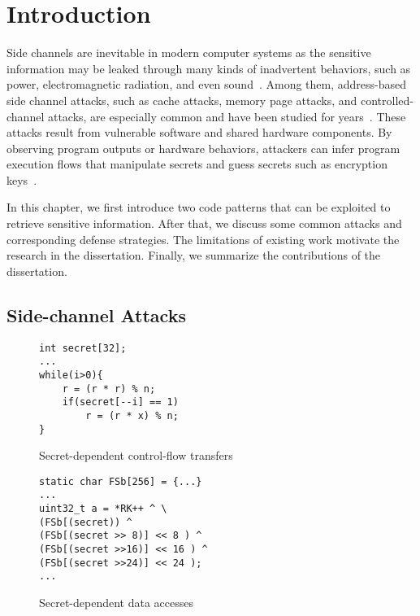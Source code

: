 
\chapter{Introduction} \label{chapter1:introduction}

Side channels are inevitable in modern computer systems as the sensitive
information may be leaked through many kinds of inadvertent behaviors, such as power, electromagnetic radiation, and even
sound~\cite{agrawal2002side,kar20178,chari1999towards,217605,genkin2014rsa}.
Among them, address-based side channel attacks, such as cache attacks, memory page attacks, and controlled-channel attacks, are especially common and have been studied for years~\cite{7163052,217543,217589,lee2017inferring,191010,liu2015last}. These
attacks result from vulnerable software and shared hardware components.
By observing program outputs or hardware behaviors, attackers can infer program
execution flows that manipulate secrets and guess secrets such as encryption
keys~\cite{Osvik2006,Gullasch:2011:CGB:2006077.2006784,203878,10.1007/978-3-540-45238-6_6}.

In this chapter, we first introduce two code patterns that can be exploited to retrieve sensitive information. After that, we discuss some common attacks and corresponding defense strategies. The limitations of existing work motivate the research in the dissertation. Finally, we summarize the contributions of the dissertation.

\section{Side-channel Attacks}
\begin{figure}[tbp]
\begin{lstlisting}[xleftmargin=.32\textwidth, xrightmargin=.32\textwidth]
int secret[32];
...
while(i>0){
    r = (r * r) % n;
    if(secret[--i] == 1)
        r = (r * x) % n;   
}
\end{lstlisting}
\caption{Secret-dependent control-flow transfers}
\label{fig:secret:cf}
\end{figure}


\begin{figure}[tbp]
\begin{lstlisting}[xleftmargin=.32\textwidth, xrightmargin=.32\textwidth]
static char FSb[256] = {...}
... 
uint32_t a = *RK++ ^ \ 
(FSb[(secret)) ^
(FSb[(secret >> 8)] << 8 ) ^
(FSb[(secret >>16)] << 16 ) ^
(FSb[(secret >>24)] << 24 );
...
\end{lstlisting}
\caption{Secret-dependent data accesses}
\label{fig:secret:da}
\end{figure}

